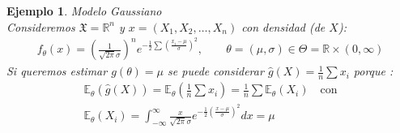 \documentclass[10pt]{article}
\theoremstyle{plain}
\newtheorem{ej}{Ejemplo}
\theoremstyle{definition}
\begin{document}
\begin{ej} Modelo Gaussiano \\
Consideremos $\mathfrak{X} = \mathbb{R}^n$ y $x = (X_{1}, X_{2}, \ldots, X_{n})$ con densidad (de $X$):
\begin{align*}
f_{\theta}(x) = \left(\frac{1}{\sqrt{2\pi}\sigma}\right)^ne^{-\frac{1}{2}\sum{\left(\frac{x_{i}-\mu}{\sigma}\right)^2}},\ &\quad \theta = (\mu, \sigma) \in \Theta = \mathbb{R}\times (0,\infty)
\end{align*}
Si queremos estimar $g(\theta) = \mu$ se puede considerar $\hat{g}(X) = \frac{1}{n}\sum{x_{i}}$ porque :
\begin{align*} %
\mathbb{E}_{\theta}(\hat{g}(X)) = \mathbb{E}_{\theta}\left(\frac{1}{n}\sum x_{i}\right) = \frac{1}{n}\sum\mathbb{E}_{\theta}(X_{i})\quad \text{con}\\
\mathbb{E}_{\theta}(X_{i})= \int_{-\infty}^{\infty}{\frac{x}{\sqrt{2\pi}\sigma}e^{-\frac{1}{2}\left(\frac{x-\mu}{\sigma}\right)^2}dx} = \mu
\end{align*}
\end{ej}
\end{document}
